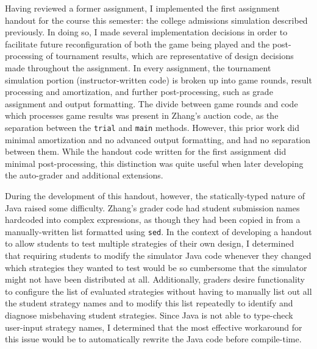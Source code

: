 \documentclass[pageno]{jpaper}
\begin{document}
Having reviewed a former assignment, I implemented the first assignment handout for the course this semester: the college admissions simulation described previously.
In doing so, I made several implementation decisions in order to facilitate future reconfiguration of both the game being played and the post-processing of tournament results, which are representative of design decisions made throughout the assignment.
In every assignment, the tournament simulation portion (instructor-written code) is broken up into game rounds, result processing and amortization, and further post-processing, such as grade assignment and output formatting.
The divide between game rounds and code which processes game results was present in Zhang's auction code, as the separation between the \texttt{trial} and \texttt{main} methods.
However, this prior work did minimal amortization and no advanced output formatting, and had no separation between them.
While the handout code written for the first assignment did minimal post-processing, this distinction was quite useful when later developing the auto-grader and additional extensions.

During the development of this handout, however, the statically-typed nature of Java raised some difficulty.
Zhang's grader code had student submission names hardcoded into complex expressions, as though they had been copied in from a manually-written list formatted using \texttt{sed}.
In the context of developing a handout to allow students to test multiple strategies of their own design, I determined that requiring students to modify the simulator Java code whenever they changed which strategies they wanted to test would be so cumbersome that the simulator might not have been distributed at all.
Additionally, graders desire functionality to configure the list of evaluated strategies without having to manually list out all the student strategy names and to modify this list repeatedly to identify and diagnose misbehaving student strategies.
Since Java is not able to type-check user-input strategy names, I determined that the most effective workaround for this issue would be to automatically rewrite the Java code before compile-time.
\end{document}
